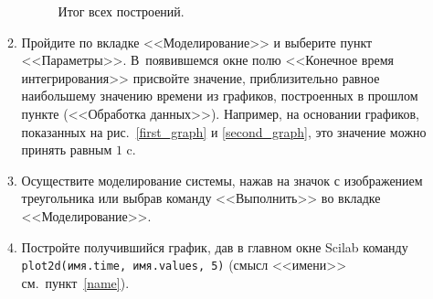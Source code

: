 \documentclass[12pt,a4paper,openany]{extarticle}
\begin{document}
\begin{enumerate}
\begin{enumerate}
\begin{figure}[h]
	\noindent{}
	\caption{Итог всех построений.}
	\label{third_graph}
\end{figure}
\item Пройдите по вкладке <<Моделирование>> и выберите пункт <<Параметры>>.
В~появившемся окне полю <<Конечное время интегрирования>> присвойте значение, приблизительно равное наибольшему значению времени из графиков, построенных в прошлом пункте (<<Обработка данных>>). 
Например, на основании графиков, показанных на рис.~\ref{first_graph} и \ref{second_graph}, это значение можно принять равным $1\text{ c}$. 
\item Осуществите моделирование системы, нажав на значок с изображением треугольника или выбрав команду <<Выполнить>> во вкладке <<Моделирование>>.
\item Постройте получившийся график, дав в главном окне Scilab команду \verb|plot2d(имя.time, имя.values, 5)| (смысл <<имени>> см.~пункт~\ref{name}). 


\end{enumerate}
\end{enumerate}
\end{document}
